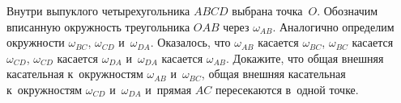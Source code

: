 \begin{problems}
\itemx{*}
Внутри выпуклого четырехугольника $ABCD$ выбрана точка~$O$.
Обозначим вписанную окружность треугольника $OAB$ через $\omega_{AB}$.
Аналогично определим окружности $\omega_{BC}$, $\omega_{CD}$ и~$\omega_{DA}$.
Оказалось, что
$\omega_{AB}$ касается $\omega_{BC}$,
$\omega_{BC}$ касается $\omega_{CD}$,
$\omega_{CD}$ касается $\omega_{DA}$
и~$\omega_{DA}$ касается $\omega_{AB}$.
Докажите, что
общая внешняя касательная к~окружностям $\omega_{AB}$ и~$\omega_{BC}$,
общая внешняя касательная к~окружностям $\omega_{CD}$ и~$\omega_{DA}$
и~прямая $AC$ пересекаются в~одной точке.

\end{problems}

